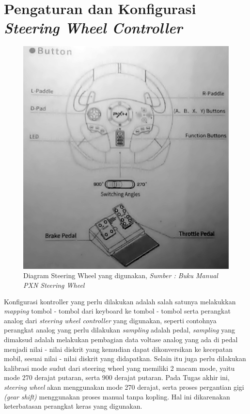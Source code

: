 \section{Pengaturan dan Konfigurasi \textit{Steering Wheel Controller}}
\label{steeringwheelconf}
\vspace{1ex}
    \begin{figure}  [!htb]
	    \captionsetup{justification=centering}
	    \includegraphics[scale=0.51]{img/steeringwheel.jpg}
	    \caption{Diagram Steering Wheel yang digunakan, \textit{Sumber : Buku Manual PXN Steering Wheel}}
	    \label{fig: 3_28}
    \end{figure}

	Konfigurasi kontroller yang perlu dilakukan adalah salah satunya melakukkan \textit{mapping} tombol - tombol dari keyboard ke tombol - tombol serta perangkat analog dari \textit{steering wheel controller} yang digunakan, seperti contohnya perangkat analog yang perlu dilakukan \textit{sampling} adalah pedal, \textit{sampling} yang dimaksud adalah melakukan pembagian data voltase analog yang ada di pedal menjadi nilai - nilai diskrit yang kemudian dapat dikonversikan ke kecepatan mobil, sesuai nilai - nilai diskrit yang didapatkan. Selain itu juga perlu dilakukan kalibrasi mode sudut dari steering wheel yang memiliki 2 macam mode, yaitu mode 270 derajat putaran, serta 900 derajat putaran. 
	Pada Tugas akhir ini, \textit{steering wheel} akan menggunakan mode 270 derajat, serta proses pergantian gigi \textit{(gear shift)} menggunakan proses manual tanpa kopling. Hal ini dikarenakan keterbatasan perangkat keras yang digunakan.
	
